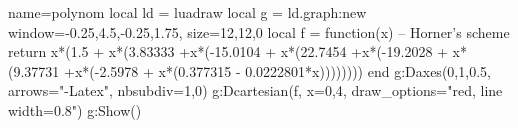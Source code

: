\documentclass{standalone}%
\begin{document}
\begin{luadraw}{name=polynom}
local ld = luadraw
local g = ld.graph:new{ window={-0.25,4.5,-0.25,1.75}, size={12,12,0} }
local f = function(x) -- Horner's scheme
    return x*(1.5 + x*(3.83333 +x*(-15.0104 + x*(22.7454 +x*(-19.2028 + x*(9.37731 +x*(-2.5978 + x*(0.377315 - 0.0222801*x)))))))) 
end
g:Daxes({0,1,0.5}, {arrows="-Latex", nbsubdiv={1,0}})
g:Dcartesian(f, {x={0,4}, draw_options="red, line width=0.8"})
g:Show()
\end{luadraw}
\end{document}
